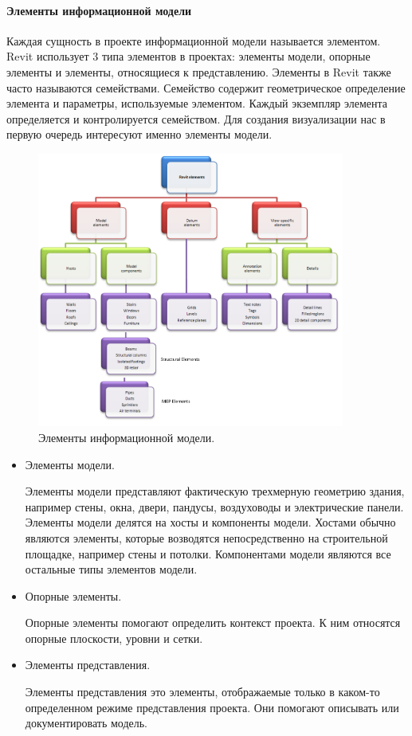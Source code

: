 ﻿\paragraph{Элементы информационной модели}

Каждая сущность в проекте информационной модели называется элементом.
Revit использует 3 типа элементов в проектах:
элементы модели, опорные элементы и элементы, относящиеся к представлению.
Элементы в Revit также часто называются семействами.
Семейство содержит геометрическое определение элемента и
параметры, используемые элементом.
Каждый экземпляр элемента определяется и контролируется семейством.%
\cite{DocRevit}
Для создания визуализации нас в первую очередь интересуют
именно элементы модели.

\begin{figure}[ht]
    \centering
    \includegraphics[width=0.9\textwidth]{images/Revit-elements.png}
    \caption{Элементы информационной модели.%
    \cite{DocRevit}}
    \label{figure:RevitElements}
\end{figure}

\begin{itemize}
    \item {
        Элементы модели.

        Элементы модели представляют фактическую трехмерную геометрию здания,
        например стены, окна, двери, пандусы,
        воздуховоды и электрические панели.
        Элементы модели делятся на хосты и компоненты модели.
        Хостами обычно являются элементы,
        которые возводятся непосредственно на строительной площадке,
        например стены и потолки.
        Компонентами модели являются все остальные типы элементов модели.
    }
    \item {
        Опорные элементы.

        Опорные элементы помогают определить контекст проекта.
        К ним относятся опорные плоскости, уровни и сетки.
    }
    \item {
        Элементы представления.

        Элементы представления это элементы,
        отображаемые только в каком-то определенном режиме представления проекта.
        Они помогают описывать или документировать модель.
    }
\end{itemize}
